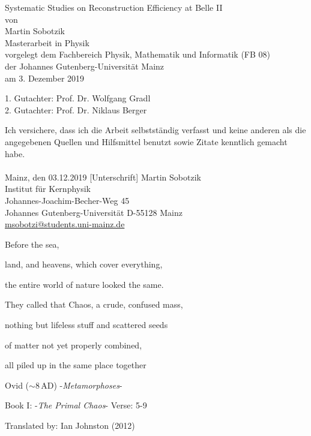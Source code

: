 \documentclass[a4paper,11pt,twosided,final,german,openbib,pdftex,listof=totoc,bibliography=totoc]{scrbook}
\newcommand\blankpage{%
	\null
	\thispagestyle{empty}%
	\addtocounter{page}{-1}%
	\newpage}
\begin{document}

\begin{titlepage}
  \vspace*{6mm}
  \begin{center}
     {\afont Systematic Studies on Reconstruction Efficiency at Belle II}
     \\[3.5cm]
     {\large von}
     \\[3.5cm]
     {\dfont Martin Sobotzik}
     \\[2cm]
     {\large Masterarbeit in Physik \/\\
        vorgelegt dem Fachbereich Physik, Mathematik und Informatik (FB 08) \/\\
        der Johannes Gutenberg-Universit\"at Mainz \/\\
        am 3. Dezember 2019}
   \end{center}
   \vfill
   1. Gutachter: Prof. Dr. Wolfgang Gradl\\	
   2. Gutachter: Prof. Dr. Niklaus Berger\\
   \vfill

\afterpage{\blankpage}


\end{titlepage}
\newpage


 

\thispagestyle{empty}
Ich versichere, dass ich die Arbeit selbstst\"andig verfasst und keine 
anderen als die angegebenen Quellen und Hilfsmittel benutzt sowie 
Zitate kenntlich gemacht habe.
\\
\\[3.5cm] 
Mainz, den 03.12.2019 [Unterschrift]
\vfill
\noindent 
Martin Sobotzik\\
Institut f\"ur Kernphysik\\
Johannes-Joachim-Becher-Weg 45\\
Johannes Gutenberg-Universit\"at
D-55128 Mainz\\
{\href{msobotzi@students.uni-mainz.de}{msobotzi@students.uni-mainz.de}}




\afterpage{\blankpage}

\newpage


\epigraph{Before the sea,                     
	              
	land, and heavens, which cover everything,
	
	the entire world of nature looked the same.
	
	They called that Chaos, a crude, confused mass,                              
	
	nothing but lifeless stuff and scattered seeds
	
	of matter not yet properly combined,
	
	all piled up in the same place together}{Ovid ($\sim 8\,\textrm{AD}$) -\textit{Metamorphoses}-
	
Book I: -\textit{The Primal Chaos}- Verse: 5-9

Translated by: Ian Johnston (2012)
}
\end{document}
